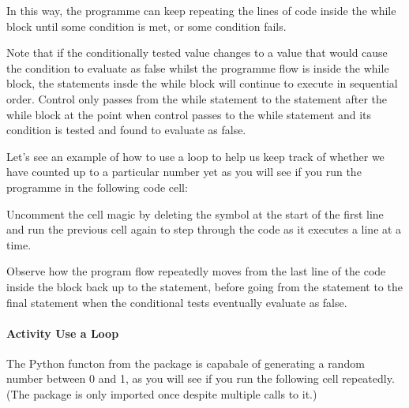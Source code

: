 \documentclass[letterpaper,10pt,english]{sphinxmanual}
\begin{document}
In this way, the programme can keep repeating the lines of code inside the while block until some condition is met, or some condition fails.

Note that if the conditionally tested value changes to a value that would cause the condition to evaluate as false whilst the programme flow is inside the while block, the statements insde the while block will continue to execute in sequential order. Control only passes from the while statement to the statement after the while block at the point when control passes to the while statement and its condition is tested and found to evaluate as false.

Let’s see an example of how to use a  loop to help us keep track of whether we have counted up to a particular number yet as you will see if you run the programme in the following code cell:

\begin{sphinxVerbatim}[commandchars=\\\{\}]
  

   
        

\end{sphinxVerbatim}

Uncomment the cell magic by deleting the \sphinxcode{\sphinxupquote{\#}} symbol at the start of the first line and run the previous cell again to step through the code as it executes a line at a time.

Observe how the program flow repeatedly moves from the last line of the code inside the  block back up to the  statement, before going from the  statement to the final  statement when the conditional tests eventually evaluate as false.


\paragraph{Activity \sphinxhyphen{} Use a  Loop}
\label{\detokenize{content/02_Robot_Lab/Section_00_01:Activity---Use-a-while-Loop}}
The Python  functon from the  package is capabale of generating a random number between 0 and 1, as you will see if you run the following cell repeatedly. (The package is only imported once despite multiple calls to it.)
\end{document}
